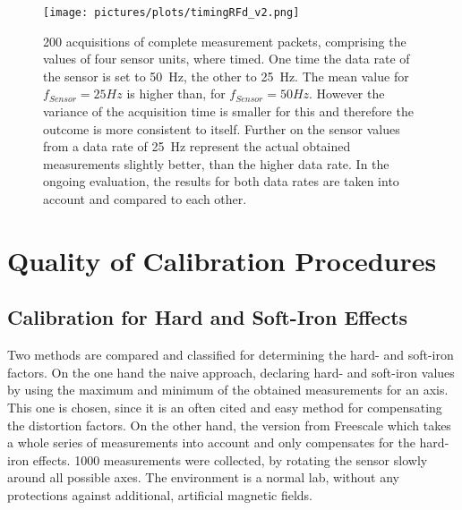 \begin{figure}[h]
\centering
\texttt{[image: pictures/plots/timingRFd\_v2.png]}
\caption{200 acquisitions of complete measurement packets, comprising the values of four sensor units, where timed. One time the data rate of the sensor is set to \SI{50}{\Hz}, the other to \SI{25}{\Hz}. The mean value for $ f_{Sensor}=25\si{Hz} $ is higher than, for $ f_{Sensor}=50\si{Hz} $. However the variance of the acquisition time is smaller for this and therefore the outcome is more consistent to itself. Further on the sensor values from a data rate of \SI{25}{\Hz} represent the actual obtained measurements slightly better, than the higher data rate. In the ongoing evaluation, the results for both data rates are taken into account and compared to each other. }
\label{fig:sensTime}
\end{figure}




\section{Quality of Calibration Procedures} \label{sec:cali}

\subsection{Calibration for Hard and Soft-Iron Effects}\label{subsec:resHardSoft}

Two methods are compared and classified for determining the hard- and soft-iron factors. On the one hand the naive approach, declaring hard- and soft-iron values by using the maximum and minimum of the obtained measurements for an axis. This one is chosen, since it is an often cited and easy method for compensating the distortion factors. On the other hand, the version from Freescale \cite{ozyagcilar2012calibrating} which takes a whole series of measurements into account and only compensates for the hard-iron effects. 1000 measurements were collected, by rotating the sensor slowly around all possible axes. The environment is a normal lab, without any protections against additional, artificial magnetic fields. 

